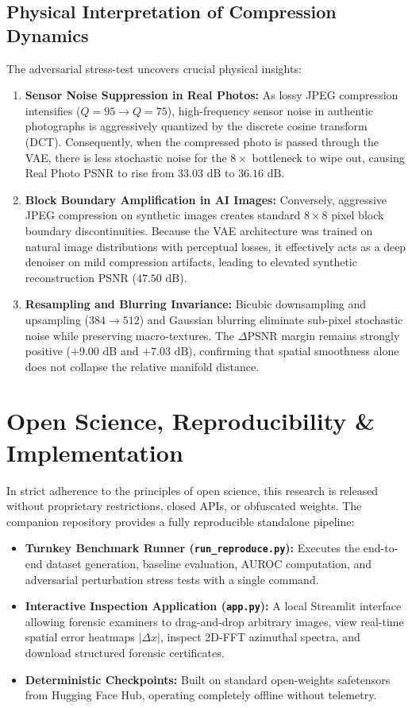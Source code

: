 \documentclass[conference]{IEEEtran}
\theoremstyle{definition}
\begin{document}
\subsection{Physical Interpretation of Compression Dynamics}
The adversarial stress-test uncovers crucial physical insights:
\begin{enumerate}
    \item \textbf{Sensor Noise Suppression in Real Photos:} As lossy JPEG compression intensifies ($Q=95 \to Q=75$), high-frequency sensor noise in authentic photographs is aggressively quantized by the discrete cosine transform (DCT). Consequently, when the compressed photo is passed through the VAE, there is less stochastic noise for the $8\times$ bottleneck to wipe out, causing Real Photo PSNR to rise from $33.03\text{ dB}$ to $36.16\text{ dB}$.
    \item \textbf{Block Boundary Amplification in AI Images:} Conversely, aggressive JPEG compression on synthetic images creates standard $8\times 8$ pixel block boundary discontinuities. Because the VAE architecture was trained on natural image distributions with perceptual losses, it effectively acts as a deep denoiser on mild compression artifacts, leading to elevated synthetic reconstruction PSNR ($47.50\text{ dB}$).
    \item \textbf{Resampling and Blurring Invariance:} Bicubic downsampling and upsampling ($384 \to 512$) and Gaussian blurring eliminate sub-pixel stochastic noise while preserving macro-textures. The $\Delta\text{PSNR}$ margin remains strongly positive ($+9.00\text{ dB}$ and $+7.03\text{ dB}$), confirming that spatial smoothness alone does not collapse the relative manifold distance.
\end{enumerate}

\section{Open Science, Reproducibility \& Implementation}

In strict adherence to the principles of open science, this research is released without proprietary restrictions, closed APIs, or obfuscated weights. The companion repository provides a fully reproducible standalone pipeline:
\begin{itemize}
    \item \textbf{Turnkey Benchmark Runner (\texttt{run\_reproduce.py}):} Executes the end-to-end dataset generation, baseline evaluation, AUROC computation, and adversarial perturbation stress tests with a single command.
    \item \textbf{Interactive Inspection Application (\texttt{app.py}):} A local Streamlit interface allowing forensic examiners to drag-and-drop arbitrary images, view real-time spatial error heatmaps $|\Delta x|$, inspect 2D-FFT azimuthal spectra, and download structured forensic certificates.
    \item \textbf{Deterministic Checkpoints:} Built on standard open-weights safetensors from Hugging Face Hub, operating completely offline without telemetry.
\end{itemize}
\end{document}
